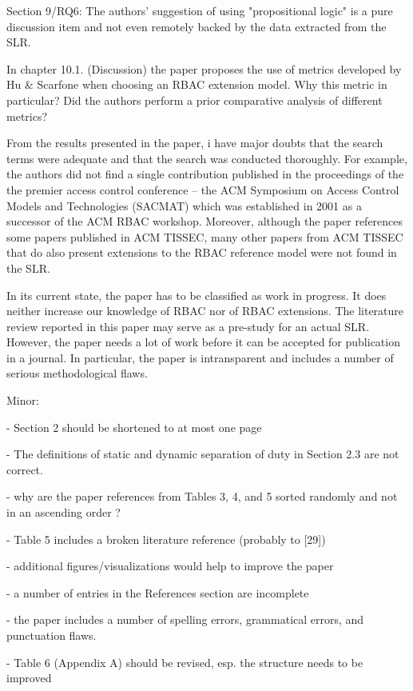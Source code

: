 Section 9/RQ6: The authors' suggestion of using "propositional
logic" is a pure discussion item and not even remotely backed by the
data extracted from the SLR.

In chapter 10.1. (Discussion) the paper proposes the use of metrics
developed by Hu & Scarfone when choosing an RBAC extension model. Why
this metric in particular? Did the authors perform a prior comparative
analysis of different metrics?

From the results presented in the paper, i have major doubts that the
search terms were adequate and that the search was conducted
thoroughly.  For example, the authors did not find a single
contribution published in the proceedings of the the premier access
control conference -- the ACM Symposium on Access Control Models and
Technologies (SACMAT) which was established in 2001 as a successor of
the ACM RBAC workshop. Moreover, although the paper references some
papers published in ACM TISSEC, many other papers from ACM TISSEC that
do also present extensions to the RBAC reference model were not found
in the SLR.

In its current state, the paper has to be classified as work in
progress. It does neither increase our knowledge of RBAC nor of RBAC
extensions.  The literature review reported in this paper may serve as
a pre-study for an actual SLR. However, the paper needs a lot of work
before it can be accepted for publication in a journal. In particular,
the paper is intransparent and includes a number of serious
methodological flaws.

Minor:

- Section 2 should be shortened to at most one page

- The definitions of static and dynamic separation of duty in Section
2.3 are not correct.

- why are the paper references from Tables 3, 4, and 5 sorted randomly
and not in an ascending order ?

- Table 5 includes a broken literature reference (probably to [29])

- additional figures/visualizations would help to improve the paper

- a number of entries in the References section are incomplete

- the paper includes a number of spelling errors, grammatical errors,
and punctuation flaws.

- Table 6 (Appendix A) should be revised, esp. the structure needs to
be improved

